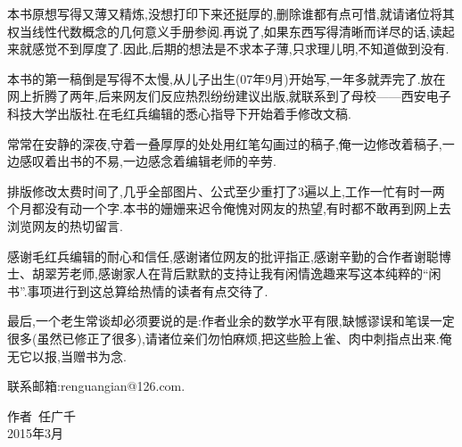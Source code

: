 \documentclass[12pt]{article}
\renewcommand{\,}{\ \text{,}}
\renewcommand{\.}{\ \text{.}}
\begin{document}
本书原想写得又薄又精炼,没想打印下来还挺厚的,删除谁都有点可惜,就请诸位将其权当线性代数概念的几何意义手册参阅.再说了,如果东西写得清晰而详尽的话,读起来就感觉不到厚度了.因此,后期的想法是不求本子薄,只求理儿明,不知道做到没有.

本书的第一稿倒是写得不太慢,从儿子出生(07年9月)开始写,一年多就弄完了.放在网上折腾了两年,后来网友们反应热烈纷纷建议出版,就联系到了母校——西安电子科技大学出版社.在毛红兵编辑的悉心指导下开始着手修改文稿.

常常在安静的深夜,守着一叠厚厚的处处用红笔勾画过的稿子,俺一边修改着稿子,一边感叹着出书的不易,一边感念着编辑老师的辛劳.

排版修改太费时间了,几乎全部图片、公式至少重打了3遍以上,工作一忙有时一两个月都没有动一个字.本书的姗姗来迟令俺愧对网友的热望,有时都不敢再到网上去浏览网友的热切留言.

感谢毛红兵编辑的耐心和信任,感谢诸位网友的批评指正,感谢辛勤的合作者谢聪博士、胡翠芳老师,感谢家人在背后默默的支持让我有闲情逸趣来写这本纯粹的“闲书”.事项进行到这总算给热情的读者有点交待了.

最后,一个老生常谈却必须要说的是:作者业余的数学水平有限,缺憾谬误和笔误一定很多(虽然已修正了很多),请诸位亲们勿怕麻烦,把这些脸上雀、肉中刺指点出来.俺无它以报,当赠书为念.

联系邮箱:renguangian@126.com.

\begin{flushright}
    \begin{minipage}[c][5cm][c]{3cm}
        \centering
        作者~任广千\\
        2015年3月
    \end{minipage}
\end{flushright}
\end{document}
